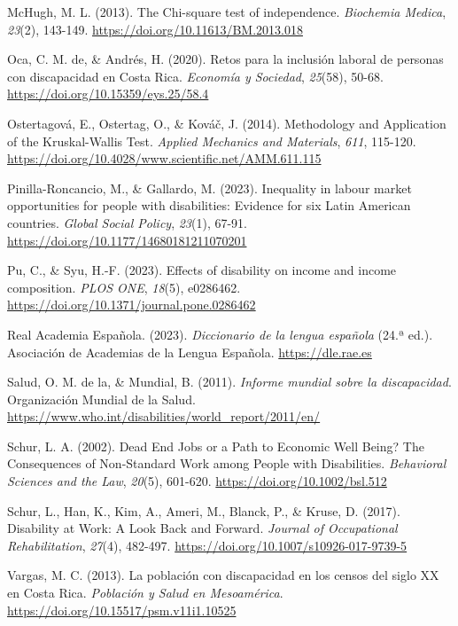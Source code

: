 \documentclass[
  11pt,
  oneside]{article}
\newlength{\cslhangindent}
\newenvironment{CSLReferences}[2] %
 {\begin{list}{}{%
  \setlength{\itemindent}{0pt}
  \setlength{\leftmargin}{0pt}
  \setlength{\parsep}{0pt}
  \ifodd #1
   \setlength{\leftmargin}{\cslhangindent}
   \setlength{\itemindent}{-1\cslhangindent}
  \fi
  \setlength{\itemsep}{#2\baselineskip}}}
 {\end{list}}
\begin{document}
\begin{CSLReferences}{1}{0}
McHugh, M. L. (2013). The Chi-square test of independence.
\emph{Biochemia Medica}, \emph{23}(2), 143-149.
\url{https://doi.org/10.11613/BM.2013.018}

Oca, C. M. de, \& Andrés, H. (2020). Retos para la inclusión laboral de
personas con discapacidad en {Costa} {Rica}. \emph{Economía y Sociedad},
\emph{25}(58), 50-68. \url{https://doi.org/10.15359/eys.25/58.4}

Ostertagová, E., Ostertag, O., \& Kováč, J. (2014). Methodology and
Application of the Kruskal-Wallis Test. \emph{Applied Mechanics and
Materials}, \emph{611}, 115-120.
\url{https://doi.org/10.4028/www.scientific.net/AMM.611.115}

Pinilla-Roncancio, M., \& Gallardo, M. (2023). Inequality in labour
market opportunities for people with disabilities: Evidence for six
Latin American countries. \emph{Global Social Policy}, \emph{23}(1),
67-91. \url{https://doi.org/10.1177/14680181211070201}

Pu, C., \& Syu, H.-F. (2023). Effects of disability on income and income
composition. \emph{PLOS ONE}, \emph{18}(5), e0286462.
\url{https://doi.org/10.1371/journal.pone.0286462}

Real Academia Española. (2023). \emph{Diccionario de la lengua española}
(24.ª ed.). Asociación de Academias de la Lengua Española.
\url{https://dle.rae.es}

Salud, O. M. de la, \& Mundial, B. (2011). \emph{Informe mundial sobre
la discapacidad}. Organización Mundial de la Salud.
\url{https://www.who.int/disabilities/world_report/2011/en/}

Schur, L. A. (2002). Dead End Jobs or a Path to Economic Well Being? The
Consequences of Non-Standard Work among People with Disabilities.
\emph{Behavioral Sciences and the Law}, \emph{20}(5), 601-620.
\url{https://doi.org/10.1002/bsl.512}

Schur, L., Han, K., Kim, A., Ameri, M., Blanck, P., \& Kruse, D. (2017).
Disability at {Work}: {A} {Look} {Back} and {Forward}. \emph{Journal of
Occupational Rehabilitation}, \emph{27}(4), 482-497.
\url{https://doi.org/10.1007/s10926-017-9739-5}

Vargas, M. C. (2013). La población con discapacidad en los censos del
siglo {XX} en {Costa} {Rica}. \emph{Población y Salud en Mesoamérica}.
\url{https://doi.org/10.15517/psm.v11i1.10525}

\end{CSLReferences}
\end{document}
